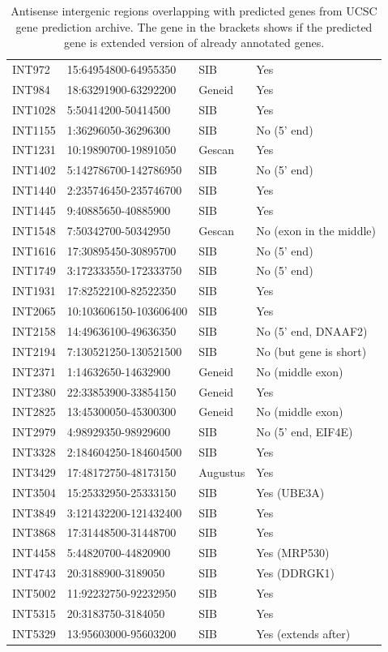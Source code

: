 \begin{table}[h]
\begin{tabular}{llll}
	INT972 & 15:64954800-64955350 & SIB & Yes \\
	INT984 & 18:63291900-63292200 & Geneid & Yes \\
	INT1028 & 5:50414200-50414500 & SIB & Yes \\
	INT1155 & 1:36296050-36296300 & SIB & No (5' end) \\
	INT1231 & 10:19890700-19891050 & Gescan & Yes \\
	INT1402 & 5:142786700-142786950 & SIB & No (5' end) \\
	INT1440 & 2:235746450-235746700 & SIB & Yes \\
	INT1445 & 9:40885650-40885900 & SIB & Yes \\
	INT1548 & 7:50342700-50342950 & Gescan & No (exon in the middle) \\
	INT1616 & 17:30895450-30895700 & SIB & No (5' end) \\
	INT1749 & 3:172333550-172333750 & SIB & No (5' end) \\
	INT1931 & 17:82522100-82522350 & SIB & Yes \\
	INT2065 & 10:103606150-103606400 & SIB & Yes \\
	INT2158 & 14:49636100-49636350 & SIB & No (5' end, DNAAF2) \\
	INT2194 & 7:130521250-130521500 & SIB & No (but gene is short) \\
	INT2371 & 1:14632650-14632900 & Geneid & No (middle exon) \\
	INT2380 & 22:33853900-33854150 & Geneid & Yes \\
	INT2825 & 13:45300050-45300300 & Geneid & No (middle exon) \\
	INT2979 & 4:98929350-98929600 & SIB & No (5' end, EIF4E) \\
	INT3328 & 2:184604250-184604500 & SIB & Yes \\
	INT3429 & 17:48172750-48173150 & Augustus & Yes \\
	INT3504 & 15:25332950-25333150 & SIB & Yes (UBE3A) \\
	INT3849 & 3:121432200-121432400 & SIB & Yes \\
	INT3868 & 17:31448500-31448700 & SIB & Yes \\
	INT4458 & 5:44820700-44820900 & SIB & Yes (MRP530) \\
	INT4743 & 20:3188900-3189050 & SIB & Yes (DDRGK1) \\
	INT5002 & 11:92232750-92232950 & SIB & Yes \\
	INT5315 & 20:3183750-3184050 & SIB & Yes \\
	INT5329 & 13:95603000-95603200 & SIB & Yes (extends after) \\
        \bottomrule
    \end{tabular}
    \caption{Antisense intergenic regions overlapping with predicted genes from UCSC gene prediction archive.
    The gene in the brackets shows if the predicted gene is extended version of already annotated genes.}
    \label{tab:predictionsAntisense}
\end{table}









